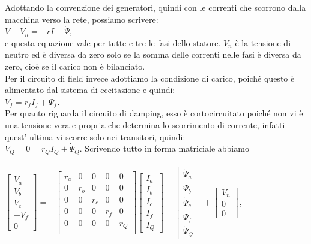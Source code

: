 \documentclass[Lau,noexaminfo]{sapthesis}
\begin{document}
	Adottando la convenzione dei generatori, quindi con le correnti che scorrono dalla macchina verso la rete, possiamo scrivere:\\
	$V-V_n=-rI-\dot{\Psi}$, \\e questa equazione vale per tutte e tre le fasi dello statore. $V_n$ è la tensione di neutro ed è diversa da zero solo se la somma delle correnti nelle fasi è diversa da zero, cioè se il carico non è bilanciato.\\
	Per il circuito di field invece adottiamo la condizione di carico, poiché questo è alimentato dal sistema di eccitazione e quindi:\\
	$V_f=r_fI_f+\dot{\Psi}_f$.\\
	Per quanto riguarda il circuito di damping, esso è cortocircuitato poiché non vi è una tensione vera e propria che determina lo scorrimento di corrente, infatti quest' ultima vi scorre solo nei transitori, quindi:\\
	$V_Q=0=r_QI_Q + \dot{\Psi}_Q$. Scrivendo tutto in forma matriciale abbiamo\\\\
	$\begin{bmatrix}
		V_a\\
		V_b\\
		V_c\\
		-V_f\\
		0
	\end{bmatrix}=-
	\begin{bmatrix}
		r_a & 0 & 0 & 0 & 0\\
		0 & r_b & 0 & 0 & 0\\
		0 & 0 & r_c & 0 & 0\\
		0 & 0 & 0 & r_f & 0\\
		0 & 0 & 0 & 0 & r_Q\\
	\end{bmatrix}
	\begin{bmatrix}
		I_a\\
		I_b\\
		I_c\\
		I_f\\
		I_Q
	\end{bmatrix}-
	\begin{bmatrix}
		\dot{\Psi}_a\\
		\dot{\Psi}_b\\
		\dot{\Psi}_c\\
		\dot{\Psi}_f\\
		\dot{\Psi}_Q
	\end{bmatrix} +
	\begin{bmatrix}
		V_n\\
		0\\
		0
	\end{bmatrix}$,\\
\end{document}
